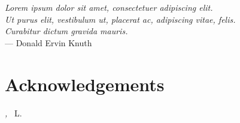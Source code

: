 
\cleardoublepage
{}
{}

\begin{flushright}{\slshape    
	Lorem ipsum dolor sit amet, consectetuer adipiscing elit. \\
	Ut purus elit, vestibulum ut, placerat ac, adipiscing vitae, felis. \\
	Curabitur dictum gravida mauris.} \\ \medskip
    --- Donald Ervin Knuth
\end{flushright}


\bigskip

\begingroup
\let\clearpage\relax
\let\cleardoublepage\relax
\let\cleardoublepage\relax

\chapter*{Acknowledgements}

\lipsum[1]

\bigskip
 
\noindent\textit{\myLocation, \MakeTextLowercase{\myTime}}
\hfill ~L.

\endgroup
